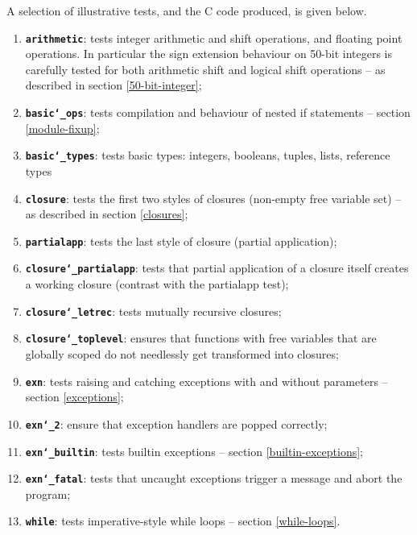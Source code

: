 \documentclass[12pt,a4paper,twoside,openright]{report}
\begin{document}
A selection of illustrative tests, and the C code produced, is given below.

\begin{enumerate}
    \item \textbf{\texttt{arithmetic}}: tests integer arithmetic and shift
        operations, and floating point operations. In particular the sign
        extension behaviour on 50-bit integers is carefully tested for both
        arithmetic shift and logical shift operations -- as described in
        section \ref{50-bit-integer};
    \item \textbf{\texttt{basic\char`_ops}}: tests compilation and behaviour of
        nested if statements -- section \ref{module-fixup};
    \item \textbf{\texttt{basic\char`_types}}: tests basic types: integers,
        booleans, tuples, lists, reference types
    \item \textbf{\texttt{closure}}: tests the first two styles of closures
        (non-empty free variable set) -- as described in section
        \ref{closures};
    \item \textbf{\texttt{partialapp}}: tests the last style of closure
        (partial application);
    \item \textbf{\texttt{closure\char`_partialapp}}: tests that partial
        application of a closure itself creates a working closure (contrast
        with the partialapp test);
    \item \textbf{\texttt{closure\char`_letrec}}: tests mutually recursive
        closures;
    \item \textbf{\texttt{closure\char`_toplevel}}: ensures that functions with
        free variables that are globally scoped do not needlessly get
        transformed into closures;
    \item \textbf{\texttt{exn}}: tests raising and catching exceptions with and
        without parameters -- section \ref{exceptions};
    \item \textbf{\texttt{exn\char`_2}}: ensure that exception handlers are
        popped correctly;
    \item \textbf{\texttt{exn\char`_builtin}}: tests builtin exceptions --
        section \ref{builtin-exceptions};
    \item \textbf{\texttt{exn\char`_fatal}}: tests that uncaught exceptions
        trigger a message and abort the program;
    \item \textbf{\texttt{while}}: tests imperative-style while loops --
        section \ref{while-loops}.

\end{enumerate}
\end{document}
